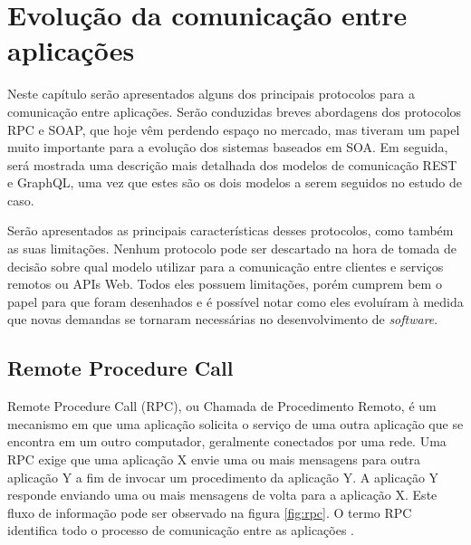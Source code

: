 \chapter[Evolução da comunicação entre aplicações]{Evolução da comunicação entre aplicações}

Neste capítulo serão apresentados alguns dos principais protocolos para a comunicação entre aplicações. Serão conduzidas breves abordagens dos protocolos RPC e SOAP, que hoje vêm perdendo espaço no mercado, mas tiveram um papel muito importante para a evolução dos sistemas baseados em SOA. Em seguida, será mostrada uma descrição mais detalhada dos modelos de comunicação REST e GraphQL, uma vez que estes são os dois modelos a serem seguidos no estudo de caso.

Serão apresentados as principais características desses protocolos, como também as suas limitações. Nenhum protocolo pode ser descartado na hora de tomada de decisão sobre qual modelo utilizar para a comunicação entre clientes e serviços remotos ou APIs Web. Todos eles possuem limitações, porém cumprem bem o papel para que foram desenhados e é possível notar como eles evoluíram à medida que novas demandas se tornaram necessárias no desenvolvimento de \textit{software}.

\section{Remote Procedure Call}\label{sec:rpc}

Remote Procedure Call (RPC), ou Chamada de Procedimento Remoto, é um mecanismo em que uma aplicação solicita o serviço de uma outra aplicação que se encontra em um outro computador, geralmente conectados por uma rede. Uma RPC exige que uma aplicação X envie uma ou mais mensagens para outra aplicação Y a fim de invocar um procedimento da aplicação Y. A aplicação Y responde enviando uma ou mais mensagens de volta para a aplicação X. Este fluxo de informação pode ser observado na figura \ref{fig:rpc}. O termo RPC identifica todo o processo de comunicação entre as aplicações \cite{merrick2006xml}.

